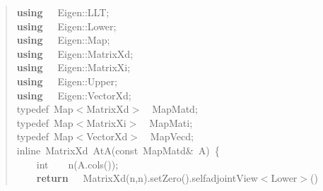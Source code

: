 \documentclass[shortnames,article]{jss}
\newcommand{\hlstd}[1]{\textcolor[rgb]{0,0,0}{#1}}
\newcommand{\hlopt}[1]{\textcolor[rgb]{0,0,0}{#1}}
\newcommand{\hlkwa}[1]{\textcolor[rgb]{0.61,0.13,0.93}{\bf{#1}}}
\newcommand{\hlkwb}[1]{\textcolor[rgb]{0.13,0.54,0.13}{#1}}
\newcommand{\hlkwc}[1]{\textcolor[rgb]{0,0,1}{#1}}
\newcommand{\hlkwd}[1]{\textcolor[rgb]{0,0,0}{#1}}
\begin{document}
\begin{quote}
  \noindent
  \ttfamily
  \hlstd{}\hlkwa{using}\hlstd{\ \ \ }\hlkwa{}\hlstd{Eigen}\hlopt{::}\hlstd{LLT}\hlopt{;}\hspace*{\fill}\\
  \hlstd{}\hlkwa{using}\hlstd{\ \ \ }\hlkwa{}\hlstd{Eigen}\hlopt{::}\hlstd{Lower}\hlopt{;}\hspace*{\fill}\\
  \hlstd{}\hlkwa{using}\hlstd{\ \ \ }\hlkwa{}\hlstd{Eigen}\hlopt{::}\hlstd{Map}\hlopt{;}\hspace*{\fill}\\
  \hlstd{}\hlkwa{using}\hlstd{\ \ \ }\hlkwa{}\hlstd{Eigen}\hlopt{::}\hlstd{MatrixXd}\hlopt{;}\hspace*{\fill}\\
  \hlstd{}\hlkwa{using}\hlstd{\ \ \ }\hlkwa{}\hlstd{Eigen}\hlopt{::}\hlstd{MatrixXi}\hlopt{;}\hspace*{\fill}\\
  \hlstd{}\hlkwa{using}\hlstd{\ \ \ }\hlkwa{}\hlstd{Eigen}\hlopt{::}\hlstd{Upper}\hlopt{;}\hspace*{\fill}\\
  \hlstd{}\hlkwa{using}\hlstd{\ \ \ }\hlkwa{}\hlstd{Eigen}\hlopt{::}\hlstd{VectorXd}\hlopt{;}\hspace*{\fill}\\
  \hlstd{}\hlkwc{typedef\ }\hlstd{Map}\hlopt{$<$}\hlstd{MatrixXd}\hlopt{$>$}\hlstd{\ \ }\hlopt{}\hlstd{MapMatd}\hlopt{;}\hspace*{\fill}\\
  \hlstd{}\hlkwc{typedef\ }\hlstd{Map}\hlopt{$<$}\hlstd{MatrixXi}\hlopt{$>$}\hlstd{\ \ }\hlopt{}\hlstd{MapMati}\hlopt{;}\hspace*{\fill}\\
  \hlstd{}\hlkwc{typedef\ }\hlstd{Map}\hlopt{$<$}\hlstd{VectorXd}\hlopt{$>$}\hlstd{\ \ }\hlopt{}\hlstd{MapVecd}\hlopt{;}\hspace*{\fill}\\
  \hlstd{}\hlkwc{inline\ }\hlstd{MatrixXd\ }\hlkwd{AtA}\hlstd{}\hlopt{(}\hlstd{}\hlkwb{const\ }\hlstd{MapMatd}\hlopt{\&\ }\hlstd{A}\hlopt{)\ \{}\hspace*{\fill}\\
  \hlstd{}\hlstd{\ \ \ \ }\hlstd{}\hlkwb{int}\hlstd{\ \ \ \ }\hlkwb{}\hlstd{}\hlkwd{n}\hlstd{}\hlopt{(}\hlstd{A}\hlopt{.}\hlstd{}\hlkwd{cols}\hlstd{}\hlopt{());}\hspace*{\fill}\\
  \hlstd{}\hlstd{\ \ \ \ }\hlstd{}\hlkwa{return}\hlstd{\ \ \ }\hlkwa{}\hlstd{}\hlkwd{MatrixXd}\hlstd{}\hlopt{(}\hlstd{n}\hlopt{,}\hlstd{n}\hlopt{).}\hlstd{}\hlkwd{setZero}\hlstd{}\hlopt{().}\hlstd{selfadjointView}\hlopt{$<$}\hlstd{Lower}\hlopt{$>$()}\hspace*{\fill}\\

\end{quote}
\end{document}
